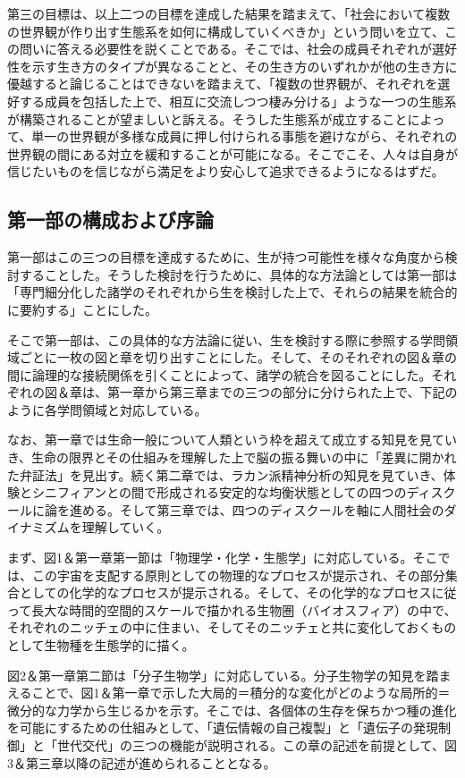第三の目標は、以上二つの目標を達成した結果を踏まえて、「社会において複数の世界観が作り出す生態系を如何に構成していくべきか」という問いを立て、この問いに答える必要性を説くことである。そこでは、社会の成員それぞれが選好性を示す生き方のタイプが異なることと、その生き方のいずれかが他の生き方に優越すると論じることはできないを踏まえて、「複数の世界観が、それぞれを選好する成員を包括した上で、相互に交流しつつ棲み分ける」ような一つの生態系が構築されることが望ましいと訴える。そうした生態系が成立することによって、単一の世界観が多様な成員に押し付けられる事態を避けながら、それぞれの世界観の間にある対立を緩和することが可能になる。そこでこそ、人々は自身が信じたいものを信じながら満足をより安心して追求できるようになるはずだ。

\subsection{第一部の構成および序論}\label{ux7b2cux4e00ux90e8ux306eux69cbux6210ux304aux3088ux3073ux5e8fux8ad6}

第一部はこの三つの目標を達成するために、生が持つ可能性を様々な角度から検討することした。そうした検討を行うために、具体的な方法論としては第一部は「専門細分化した諸学のそれぞれから生を検討した上で、それらの結果を統合的に要約する」ことにした。

そこで第一部は、この具体的な方法論に従い、生を検討する際に参照する学問領域ごとに一枚の図と章を切り出すことにした。そして、そのそれぞれの図＆章の間に論理的な接続関係を引くことによって、諸学の統合を図ることにした。それぞれの図＆章は、第一章から第三章までの三つの部分に分けられた上で、下記のように各学問領域と対応している。

なお、第一章では生命一般について人類という枠を超えて成立する知見を見ていき、生命の限界とその仕組みを理解した上で脳の振る舞いの中に「差異に開かれた弁証法」を見出す。続く第二章では、ラカン派精神分析の知見を見ていき、体験とシニフィアンとの間で形成される安定的な均衡状態としての四つのディスクールに論を進める。そして第三章では、四つのディスクールを軸に人間社会のダイナミズムを理解していく。

まず、図1＆第一章第一節は「物理学・化学・生態学」に対応している。そこでは、この宇宙を支配する原則としての物理的なプロセスが提示され、その部分集合としての化学的なプロセスが提示される。そして、その化学的なプロセスに従って長大な時間的空間的スケールで描かれる生物圏（バイオスフィア）の中で、それぞれのニッチェの中に住まい、そしてそのニッチェと共に変化しておくものとして生物種を生態学的に描く。

図2＆第一章第二節は「分子生物学」に対応している。分子生物学の知見を踏まえることで、図1＆第一章で示した大局的＝積分的な変化がどのような局所的＝微分的な力学から生じるかを示す。そこでは、各個体の生存を保ちかつ種の進化を可能にするための仕組みとして、「遺伝情報の自己複製」と「遺伝子の発現制御」と「世代交代」の三つの機能が説明される。この章の記述を前提として、図3＆第三章以降の記述が進められることとなる。

